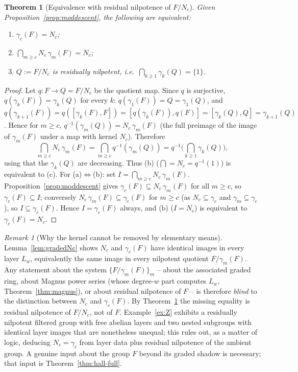 \documentclass{amsart}
\newtheorem{theorem}{Theorem}
\theoremstyle{definition}
\theoremstyle{remark}
\newtheorem{remark}{Remark}
\begin{document}
\begin{theorem}[Equivalence with residual nilpotence of $F/N_c$]\label{thm:equiv}
Given Proposition~\ref{prop:moddescent}, the following are equivalent:
\begin{enumerate}
\item[(a)] $\gamma_c(F)=N_c$;
\item[(b)] $\bigcap_{m\ge c} N_c\,\gamma_m(F)=N_c$;
\item[(c)] $Q:=F/N_c$ is residually nilpotent, i.e.\
$\bigcap_{k\ge1}\gamma_k(Q)=\{1\}$.
\end{enumerate}
\end{theorem}

\begin{proof}
Let $q\colon F\to Q=F/N_c$ be the quotient map. Since $q$ is surjective,
$q(\gamma_k(F))=\gamma_k(Q)$ for every $k$: $q(\gamma_1(F))=Q=\gamma_1(Q)$, and
$q(\gamma_{k+1}(F))=q([\gamma_k(F),F])=[q(\gamma_k(F)),q(F)]
=[\gamma_k(Q),Q]=\gamma_{k+1}(Q)$. Hence for $m\ge c$,
$q^{-1}(\gamma_m(Q))=N_c\,\gamma_m(F)$ (the full preimage of the image of
$\gamma_m(F)$ under a map with kernel $N_c$). Therefore
\[
\bigcap_{m\ge c} N_c\,\gamma_m(F)=\bigcap_{m\ge c} q^{-1}(\gamma_m(Q))
=q^{-1}\!\Big(\bigcap_{k\ge1}\gamma_k(Q)\Big),
\]
using that the $\gamma_k(Q)$ are decreasing. Thus (b) ($\bigcap=N_c=q^{-1}(1)$) is
equivalent to (c). For (a)$\Leftrightarrow$(b): set $I=\bigcap_{m\ge
c}N_c\,\gamma_m(F)$. Proposition~\ref{prop:moddescent} gives
$\gamma_c(F)\subseteq N_c\,\gamma_m(F)$ for all $m\ge c$, so
$\gamma_c(F)\subseteq I$; conversely $N_c\,\gamma_m(F)\subseteq\gamma_c(F)$ for
$m\ge c$ (as $N_c\subseteq\gamma_c$ and $\gamma_m\subseteq\gamma_c$), so
$I\subseteq\gamma_c(F)$. Hence $I=\gamma_c(F)$ always, and (b) ($I=N_c$) is
equivalent to $\gamma_c(F)=N_c$.
\end{proof}

\begin{remark}[Why the kernel cannot be removed by elementary means]
\label{rem:graded-insufficient}
Lemma~\ref{lem:gradedNc} shows $N_c$ and $\gamma_c(F)$ have identical images in
every layer $L_w$, equivalently the same image in every nilpotent quotient
$F/\gamma_m(F)$. Any statement about the system $\{F/\gamma_m(F)\}_m$ -- about the
associated graded ring, about Magnus power series (whose degree-$w$ part computes
$L_w$, Theorem~\ref{thm:magnus}), or about residual nilpotence of $F$ -- is
therefore \emph{blind} to the distinction between $N_c$ and $\gamma_c(F)$. By
Theorem~\ref{thm:equiv} the missing equality is residual nilpotence of $F/N_c$,
not of $F$. Example~\ref{ex:Z} exhibits a residually nilpotent filtered group with
free abelian layers and two nested subgroups with identical layer images that are
nonetheless unequal; this rules out, as a matter of logic, deducing $N_c=\gamma_c$
from layer data plus residual nilpotence of the ambient group. A genuine input
about the group $F$ beyond its graded shadow is necessary; that input is
Theorem~\ref{thm:hall-full}.
\end{remark}
\end{document}

